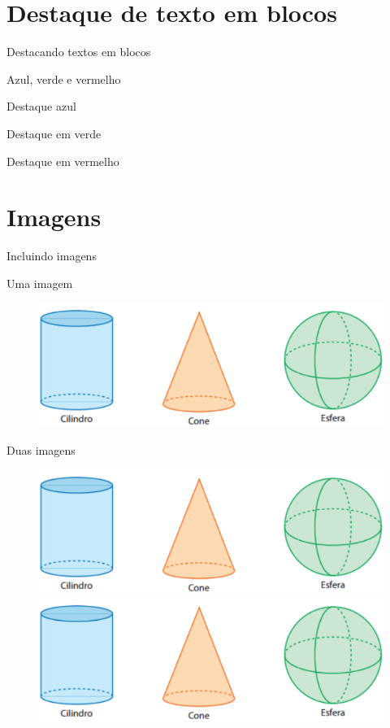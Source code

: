\documentclass[aspectratio=169,xcolor=dvipsnames]{beamer}
\begin{document}
\section{Destaque de texto em blocos}
\begin{frame}
    \center \Huge Destacando textos em blocos
\end{frame}
\begin{frame}{Azul, verde e vermelho}
    \begin{block}{Destaque azul}
        \lipsum[1][3-5]
    \end{block}

    \begin{exampleblock}{Destaque em verde}
        \lipsum[1][1-3]
    \end{exampleblock}

    \begin{alertblock}{Destaque em vermelho}
        \lipsum[1][5-7]
    \end{alertblock}
\end{frame}

\section{Imagens}
\begin{frame}
    \center \Huge Incluindo imagens
\end{frame}

\begin{frame}{Uma imagem}
    \begin{figure}
        \includegraphics[width=0.8\linewidth]{img/imagem.png}
    \end{figure}
\end{frame}

\begin{frame}{Duas imagens}
    \begin{figure}
        \includegraphics[width=0.5\linewidth]{img/imagem.png}
        \includegraphics[width=0.5\linewidth]{img/imagem.png}
    \end{figure}
\end{frame}
\end{document}
